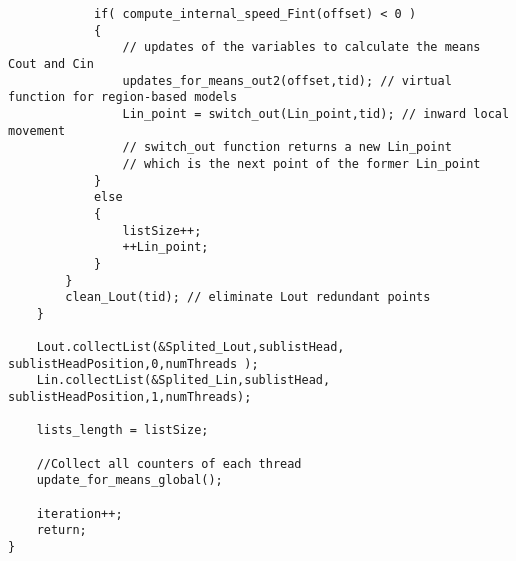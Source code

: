 \begin{appendices}
\begin{lstlisting}
			if( compute_internal_speed_Fint(offset) < 0 )
			{
				// updates of the variables to calculate the means Cout and Cin
				updates_for_means_out2(offset,tid); // virtual function for region-based models
				Lin_point = switch_out(Lin_point,tid); // inward local movement
				// switch_out function returns a new Lin_point
				// which is the next point of the former Lin_point
			}
			else
			{
				listSize++;
				++Lin_point;
			}
		}
		clean_Lout(tid); // eliminate Lout redundant points
	}
	
	Lout.collectList(&Splited_Lout,sublistHead, sublistHeadPosition,0,numThreads );
	Lin.collectList(&Splited_Lin,sublistHead, sublistHeadPosition,1,numThreads);
	
	lists_length = listSize;
	
	//Collect all counters of each thread
	update_for_means_global();
	
	iteration++;
	return;
}
\end{lstlisting}

\end{appendices}
